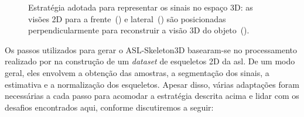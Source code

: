 \begin{figure}[ht!]
    \centering
    \caption{\textmd{Estratégia adotada para representar os sinais no espaço 3D: as visões 2D para a frente~() e lateral~() são posicionadas perpendicularmente para reconstruir a visão 3D do objeto~().}}
    \hfill
    \hfill
    \nomefonte{}
    \label{fig:our-strategy-3d}
\end{figure}


Os passos utilizados para gerar o ASL-Skeleton3D basearam-se no processamento realizado por  na construção de um \textit{dataset} de esqueletos 2D da \acrshort{asl}. De um modo geral, eles envolvem a obtenção das amostras, a segmentação dos sinais, a estimativa e a normalização dos esqueletos. Apesar disso, várias adaptações foram necessárias a cada passo para acomodar a estratégia descrita acima e lidar com os desafios encontrados aqui, conforme discutiremos a seguir:

